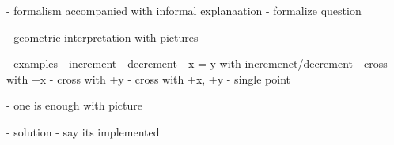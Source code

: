\documentclass[xcolor={dvipsnames,svgnames,table}]{beamer}
\begin{document}
\begin{frame}
  - formalism accompanied with informal explanaation
  - formalize question
\end{frame}

\begin{frame}
  - geometric interpretation with pictures
\end{frame}

\begin{frame}
  - examples
  - increment
  - decrement
  - x = y with incremenet/decrement
  - cross with +x
  - cross with +y
  - cross with +x, +y
  - single point
\end{frame}

\begin{frame}
  - one is enough with picture
\end{frame}

\begin{frame}
  - solution
  - say its implemented
\end{frame}
\end{document}
